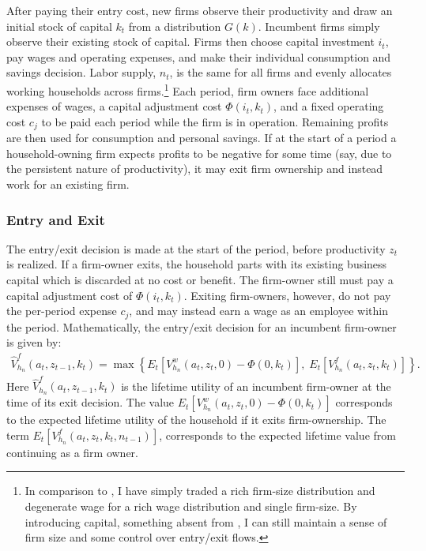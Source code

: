 \documentclass[11pt]{article}
\theoremstyle{definition}
\numberwithin{equation}{section}
\begin{document}
After paying their entry cost, new firms observe their productivity and draw an initial stock of capital $k_t$ from a distribution $G(k)$. Incumbent firms simply observe their existing stock of capital. Firms then choose capital investment $i_t$, pay wages and operating expenses, and make their individual consumption and savings decision. Labor supply, $n_t$, is the same for all firms and evenly allocates working households across firms.\footnote{ In comparison to \cite{hopenhayn1993job}, I have simply traded a rich firm-size distribution and degenerate wage for a rich wage distribution and single firm-size. By introducing capital, something absent from \cite{hopenhayn1993job}, I can still maintain a sense of firm size and some control over entry/exit flows.
} 
Each period, firm owners face additional expenses of wages, a capital adjustment cost $\Phi(i_t,k_t)$, and a fixed operating cost $c_j$ to be paid each period while the firm is in operation. Remaining profits are then used for consumption and personal savings. If at the start of a period a household-owning firm expects profits to be negative for some time (say, due to the persistent nature of productivity), it may exit firm ownership and instead work for an existing firm. 


\subsubsection{Entry and Exit}
The entry/exit decision is made at the start of the period, before productivity $z_t$ is realized. If a firm-owner exits, the household parts with its existing business capital which is discarded at no cost or benefit. The firm-owner still must pay a capital adjustment cost of $\Phi(i_t,k_t)$. Exiting firm-owners, however, do not pay the per-period expense $c_j$, and may instead earn a wage as an employee within the period. Mathematically, the entry/exit decision for an incumbent firm-owner is given by:
%
\begin{eqnarray}\label{}
\hat{V}^f_{h_n}(a_t,z_{t-1},k_t)=\max\left\{ E_t\left[ V^w_{h_n}(a_t,z_t,0)-\Phi(0,k_t) \right],\; E_t\left[ V^f_{h_n}(a_t,z_t,k_t)\right]\right\}.
\end{eqnarray}
%
Here $\hat{V}^f_{h_n}(a_t,z_{t-1},k_t)$ is the lifetime utility of an incumbent firm-owner at the time of its exit decision. The value $E_t\left[ V^w_{h_n}(a_t,z_t,0)-\Phi(0,k_t) \right]$ corresponds to the expected lifetime utility of the household if it exits firm-ownership. The term $E_t\left[ V^f_{h_n}(a_t,z_t,k_t,n_{t-1})\right]$, corresponds to the expected lifetime value from continuing as a firm owner. 
\end{document}
